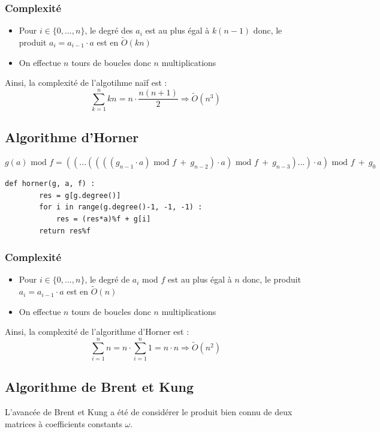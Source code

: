 \documentclass[a4paper]{article}
\begin{document}
\subsubsection*{Complexité}
\begin{itemize}
    \item Pour $i \in \{0,...,n\}$, le degré des $a_i$ est au plus égal à $k(n-1)$ donc, le produit $a_i=a_{i-1}\cdot a$ est en $\tilde{O}(kn)$
    \item On effectue $n$ tours de boucles donc $n$ multiplications
\end{itemize}
Ainsi, la complexité de l'algotihme naïf est :
\[
\sum_{k=1}^{n}kn=n \cdot \dfrac{n(n+1)}{2} \Longrightarrow \tilde{O}(n^3)
\]

\subsection{Algorithme d'Horner}

\[
g(a)\text{ mod }f = ((...((((g_{n-1}\cdot a)\text{ mod }f\ +\ g_{n-2})\cdot a)\text{ mod }f\ +\ g_{n-3})...)\cdot a)\text{ mod }f\ +\ g_0
\]

\begin{lstlisting}[title={Horner}]
    def horner(g, a, f) :
        res = g[g.degree()]
        for i in range(g.degree()-1, -1, -1) :
            res = (res*a)%f + g[i]
        return res%f
    \end{lstlisting}

\subsubsection*{Complexité}
\begin{itemize}
    \item Pour $i \in \{0,...,n\}$, le degré de $a_i$ mod $f$ est au plus égal à $n$ donc, le produit $a_i=a_{i-1}\cdot a$ est en $\tilde{O}(n)$
    \item On effectue $n$ tours de boucles donc $n$ multiplications
\end{itemize}
Ainsi, la complexité de l'algorithme d'Horner est :
\[
\sum_{i=1}^n n=n\cdot \sum_{i=1}^n 1 = n\cdot n\Longrightarrow \tilde{O}(n^2)
\]

\subsection{Algorithme de Brent et Kung}

L'avancée de Brent et Kung a été de considérer le produit bien connu de deux matrices à coefficients constants $\omega$.
\end{document}

